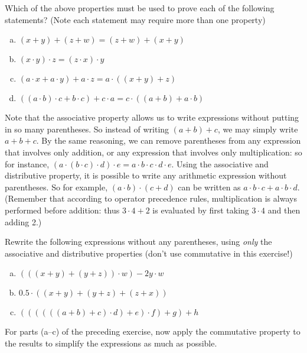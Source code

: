 \begin{exercise}{}
Which of the above properties must be used to prove each of the following statements? (Note each statement may require more than one property)
\begin{enumerate}[(a)]
\item
$(x+y)+(z+w) = (z+w)+(x+y)$
\item
$(x \cdot y) \cdot z = ( z \cdot  x) \cdot y$
\item
$(a\cdot x + a \cdot y) + a \cdot z = a \cdot ( (x+y) + z)$
\item
$((a \cdot b) \cdot c + b \cdot c) + c \cdot a = c \cdot ((a+b) + a \cdot b)$
\end{enumerate}
\end{exercise} 

Note that the associative property allows us to write expressions without putting in so many parentheses.  So instead of writing $(a+b)+c$, we may simply write $a+b+c$. By the same reasoning, we can remove parentheses from any expression that involves only addition, or any expression that involves only multiplication: so for instance, $(a \cdot (b \cdot c) \cdot d) \cdot e = a \cdot b \cdot c \cdot d \cdot e$. Using the associative and distributive property, it is possible to write any arithmetic expression without parentheses. So for example, $(a \cdot b) \cdot (c + d)$ can be written as $a \cdot b \cdot c + a \cdot b \cdot d$.  (Remember that according to operator precedence rules, multiplication is always performed before addition: thus $3 \cdot 4 + 2$ is evaluated by first taking $3 \cdot 4$ and then adding 2.)

\begin{exercise}{}
Rewrite the following expressions without any parentheses, using \emph{only} the  associative and distributive properties  (don't use commutative in this exercise!)
\begin{enumerate}[(a)]
\item
$(((x + y) + (y+z))\cdot w) - 2y \cdot w$
\item
$0.5 \cdot ( (x+y) + (y + z) + (z + x))$
\item
$((((((a+b)+c) \cdot d)+ e) \cdot f) + g) + h$
\end{enumerate}
\end{exercise}

\begin{exercise}{}
For parts (a--c) of the preceding exercise, now apply the commutative property to the results to simplify the expressions as much as possible.
\end{exercise}

